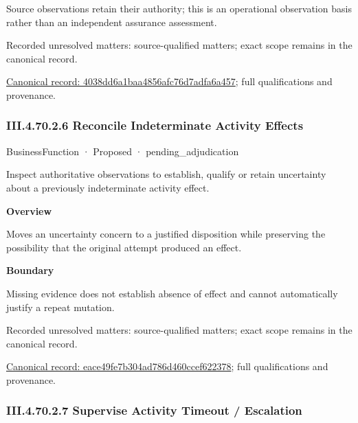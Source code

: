 Source observations retain their authority; this is an operational observation basis rather than an independent assurance assessment.


{\small Recorded unresolved matters: source-qualified matters; exact scope remains in the canonical record.}\par
{\footnotesize \href{../../../../continuum/business/business-function/4038dd6a1baa4856afc76d7adfa6a457.md}{Canonical record: 4038dd6a1baa4856afc76d7adfa6a457}; full qualifications and provenance.}\par
\subsubsection*{III.4.70.2.6 Reconcile Indeterminate Activity Effects}
\label{navigation:III.4.70.2.6}

\label{element:eace49fe7b304ad786d460ccef622378}
{\small BusinessFunction · Proposed · pending\_adjudication}\par

Inspect authoritative observations to establish, qualify or retain uncertainty about a previously indeterminate activity effect.



\textbf{Overview}



Moves an uncertainty concern to a justified disposition while preserving the possibility that the original attempt produced an effect.



\textbf{Boundary}



Missing evidence does not establish absence of effect and cannot automatically justify a repeat mutation.


{\small Recorded unresolved matters: source-qualified matters; exact scope remains in the canonical record.}\par
{\footnotesize \href{../../../../continuum/business/business-function/eace49fe7b304ad786d460ccef622378.md}{Canonical record: eace49fe7b304ad786d460ccef622378}; full qualifications and provenance.}\par
\subsubsection*{III.4.70.2.7 Supervise Activity Timeout / Escalation}
\label{navigation:III.4.70.2.7}

